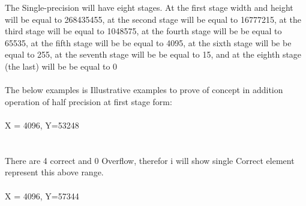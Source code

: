 \documentclass[11pt]{article}
\begin{document}
The Single-precision will have eight stages. At the first stage width and height will be equal to 268435455, at the second stage will be equal to 16777215, at the third stage will be equal to 1048575, at the fourth stage will be be equal to 65535, at the fifth stage will be be equal to 4095, at the sixth stage will be be equal to 255, at the seventh stage will be be equal to 15, and at the eighth stage (the last) will be be equal to 0\\\\
The below examples is Illustrative examples to prove of concept in addition operation of half precision at first stage form:\\\\
X = 4096, Y=53248\\
\\\\
There are 4 correct and 0 Overflow, therefor i will show single Correct element represent this above range.\\\\
X = 4096, Y=57344\\
\\\\
\end{document}
